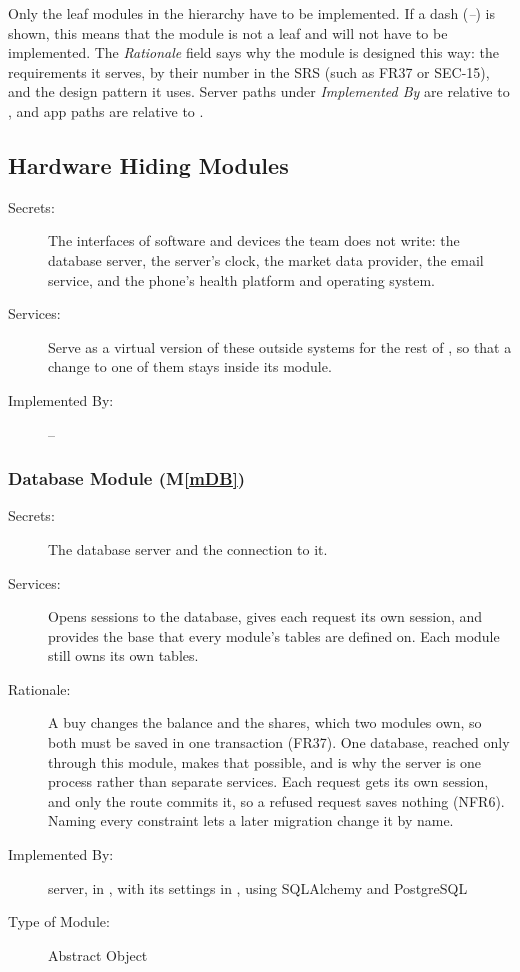 \documentclass[12pt, titlepage]{article}
\newcommand{\mref}[1]{M\ref{#1}}
\begin{document}
Only the leaf modules in the hierarchy have to be implemented. If a dash
(\emph{--}) is shown, this means that the module is not a leaf and will not have
to be implemented. The \emph{Rationale} field says why the module is designed
this way: the requirements it serves, by their number in the SRS (such as FR37
or SEC-15), and the design pattern it uses. Server paths under \emph{Implemented By} are relative to
, and app paths are relative to .

\subsection{Hardware Hiding Modules}

\begin{description}
\item[Secrets:] The interfaces of software and devices the team does not
  write: the database server, the server's clock, the market data provider, the
  email service, and the phone's health platform and operating system.
\item[Services:] Serve as a virtual version of these outside systems for the
  rest of \progname{}, so that a change to one of them stays inside its module.
\item[Implemented By:] --
\end{description}

\subsubsection{Database Module (\mref{mDB})}

\begin{description}
\item[Secrets:] The database server and the connection to it.
\item[Services:] Opens sessions to the database, gives each request its own session, and provides the base that every module's tables are defined on. Each module still owns its own tables.
\item[Rationale:] A buy changes the balance and the shares, which two modules own, so both must be saved in one transaction (FR37). One database, reached only through this module, makes that possible, and is why the server is one process rather than separate services. Each request gets its own session, and only the route commits it, so a refused request saves nothing (NFR6). Naming every constraint lets a later migration change it by name.
\item[Implemented By:] \progname{} server, in , with its settings in , using SQLAlchemy and PostgreSQL
\item[Type of Module:] Abstract Object
\end{description}
\end{document}
